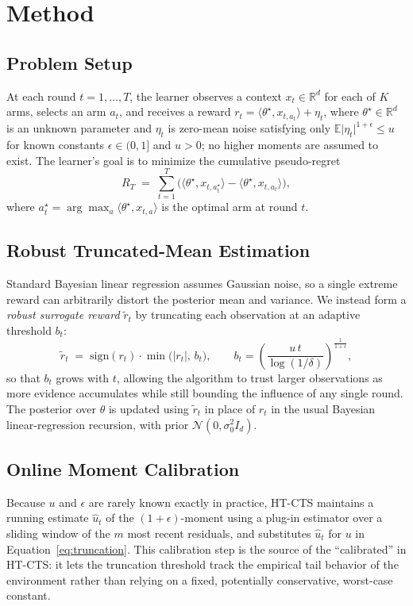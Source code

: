\section{Method}
\label{sec:method}

\subsection{Problem Setup}
At each round $t = 1, \dots, T$, the learner observes a context $x_t \in \mathbb{R}^d$ for each of $K$ arms, selects an arm $a_t$, and receives a reward $r_t = \langle \theta^{\star}, x_{t, a_t} \rangle + \eta_t$, where $\theta^{\star} \in \mathbb{R}^d$ is an unknown parameter and $\eta_t$ is zero-mean noise satisfying only $\mathbb{E}\lvert \eta_t \rvert^{1+\epsilon} \le u$ for known constants $\epsilon \in (0,1]$ and $u > 0$; no higher moments are assumed to exist. The learner's goal is to minimize the cumulative pseudo-regret
\begin{equation}
R_T \;=\; \sum_{t=1}^{T} \Big( \langle \theta^{\star}, x_{t, a_t^{\star}} \rangle - \langle \theta^{\star}, x_{t, a_t} \rangle \Big),
\label{eq:regret-def}
\end{equation}
where $a_t^{\star} = \arg\max_a \langle \theta^{\star}, x_{t,a} \rangle$ is the optimal arm at round $t$.

\subsection{Robust Truncated-Mean Estimation}
Standard Bayesian linear regression assumes Gaussian noise, so a single extreme reward can arbitrarily distort the posterior mean and variance. We instead form a \emph{robust surrogate reward} $\tilde{r}_t$ by truncating each observation at an adaptive threshold $b_t$:
\begin{equation}
\tilde{r}_t \;=\; \mathrm{sign}(r_t) \cdot \min\big(|r_t|,\, b_t\big), \qquad b_t = \left( \frac{u\, t}{\log(1/\delta)} \right)^{\frac{1}{1+\epsilon}}\!\!,
\label{eq:truncation}
\end{equation}
so that $b_t$ grows with $t$, allowing the algorithm to trust larger observations as more evidence accumulates while still bounding the influence of any single round. The posterior over $\theta$ is updated using $\tilde{r}_t$ in place of $r_t$ in the usual Bayesian linear-regression recursion, with prior $\mathcal{N}(0, \sigma_0^2 I_d)$.

\subsection{Online Moment Calibration}
Because $u$ and $\epsilon$ are rarely known exactly in practice, HT-CTS maintains a running estimate $\hat{u}_t$ of the $(1+\epsilon)$-moment using a plug-in estimator over a sliding window of the $m$ most recent residuals, and substitutes $\hat{u}_t$ for $u$ in Equation~\ref{eq:truncation}. This calibration step is the source of the ``calibrated'' in HT-CTS: it lets the truncation threshold track the empirical tail behavior of the environment rather than relying on a fixed, potentially conservative, worst-case constant.

